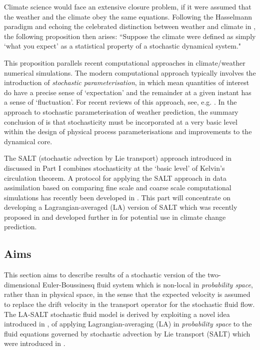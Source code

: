 \documentclass[11pt, oneside]{article}   	%
\numberwithin{equation}{section}
\theoremstyle{plain}
\theoremstyle{definition}
\theoremstyle{remark}
\newcommand{\<}{\langle}
\renewcommand{\>}{\rangle}
\begin{document}
Climate science would face an extensive closure problem, if it were assumed that the weather and the climate obey the same equations. 
Following the Hasselmann paradigm \cite{hasselmann1976stochastic} and echoing the celebrated distinction between weather and climate in \cite{Lorenz1995}, the following proposition then arises: ``Suppose the climate were defined as simply `what you expect' as a statistical property of a stochastic dynamical system." 

This proposition parallels recent computational approaches in climate/weather numerical simulations. The modern computational approach typically involves the introduction of \textit{stochastic parameterisation}, in which mean quantities of interest do have a precise sense of `expectation' and the remainder at a given instant has a sense of `fluctuation'. For recent reviews of this approach, see, e.g. \cite{BYP2012, Berner-etal-2017,GCF2015}.   In the approach to stochastic parameterisation of weather prediction, the summary conclusion of \cite{BYP2012} is that stochasticity must be incorporated at a very basic level within the design of physical process parameterisations and improvements to the dynamical core.

The SALT (stochastic advection by Lie transport) approach introduced in \cite{Holm2015} discussed in Part I combines stochasticity at the `basic level' of Kelvin's circulation theorem. A protocol for applying the SALT approach in data assimilation based on comparing fine scale and coarse scale computational simulations has recently been developed in \cite{CCHOS18a,CCHOS18b}. This part will concentrate on developing a Lagrangian-averaged (LA) version of SALT which was recently proposed in \cite{DrivasHolm2019} and developed further in \cite{DrivasHolmLeahy2020} for potential use in climate change prediction.


\subsection{Aims}
This section aims to describe results of a stochastic version of the two-dimensional Euler-Boussinesq fluid system which is non-local in \emph{probability space}, rather than in physical space, in the sense that the expected velocity is assumed to replace the drift velocity in the transport operator for the stochastic fluid flow. The LA-SALT stochastic fluid model is derived by exploiting a novel idea introduced in \cite{DrivasHolm2019}, of applying Lagrangian-averaging (LA) in \emph{probability space} to the fluid equations governed by stochastic advection by Lie transport (SALT) which were introduced in \cite{Holm2015}.  
\end{document}
